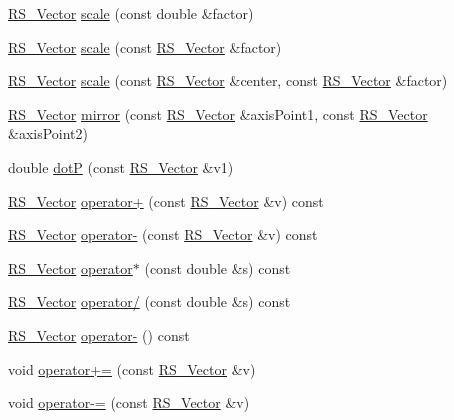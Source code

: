 \begin{DoxyCompactItemize}
\item 
\hyperlink{classRS__Vector}{R\-S\-\_\-\-Vector} \hyperlink{classRS__Vector_af9abbe643151e7c6e5c19b87e9eba41f}{scale} (const double \&factor)
\item 
\hyperlink{classRS__Vector}{R\-S\-\_\-\-Vector} \hyperlink{classRS__Vector_ac693a33d29ecf1c0833b7a83a62b7503}{scale} (const \hyperlink{classRS__Vector}{R\-S\-\_\-\-Vector} \&factor)
\item 
\hyperlink{classRS__Vector}{R\-S\-\_\-\-Vector} \hyperlink{classRS__Vector_ab27d55398d9b7ce9e9f2a365aa05233f}{scale} (const \hyperlink{classRS__Vector}{R\-S\-\_\-\-Vector} \&center, const \hyperlink{classRS__Vector}{R\-S\-\_\-\-Vector} \&factor)
\item 
\hyperlink{classRS__Vector}{R\-S\-\_\-\-Vector} \hyperlink{classRS__Vector_a7ac60264986fedb94391e9318a197c61}{mirror} (const \hyperlink{classRS__Vector}{R\-S\-\_\-\-Vector} \&axis\-Point1, const \hyperlink{classRS__Vector}{R\-S\-\_\-\-Vector} \&axis\-Point2)
\item 
double \hyperlink{classRS__Vector_aa3cd9b00a5860364f5cb82668f221ddf}{dot\-P} (const \hyperlink{classRS__Vector}{R\-S\-\_\-\-Vector} \&v1)
\item 
\hyperlink{classRS__Vector}{R\-S\-\_\-\-Vector} \hyperlink{classRS__Vector_a91c68dba1205738490da545d3a425b05}{operator+} (const \hyperlink{classRS__Vector}{R\-S\-\_\-\-Vector} \&v) const 
\item 
\hyperlink{classRS__Vector}{R\-S\-\_\-\-Vector} \hyperlink{classRS__Vector_a18563367cac322844e732916b7bae69a}{operator-\/} (const \hyperlink{classRS__Vector}{R\-S\-\_\-\-Vector} \&v) const 
\item 
\hyperlink{classRS__Vector}{R\-S\-\_\-\-Vector} \hyperlink{classRS__Vector_ac67e08f66c838c01e0945371a6026ecc}{operator$\ast$} (const double \&s) const 
\item 
\hyperlink{classRS__Vector}{R\-S\-\_\-\-Vector} \hyperlink{classRS__Vector_a6ea84de2b038b8ba34212da685d920f8}{operator/} (const double \&s) const 
\item 
\hyperlink{classRS__Vector}{R\-S\-\_\-\-Vector} \hyperlink{classRS__Vector_aef40989e83648c190011b3f3bfe653d5}{operator-\/} () const 
\item 
void \hyperlink{classRS__Vector_a10f89437491fcd25a980a63ce50f1755}{operator+=} (const \hyperlink{classRS__Vector}{R\-S\-\_\-\-Vector} \&v)
\item 
void \hyperlink{classRS__Vector_a22412abd21eeb0efb7449ab15e55812e}{operator-\/=} (const \hyperlink{classRS__Vector}{R\-S\-\_\-\-Vector} \&v)

\end{DoxyCompactItemize}
